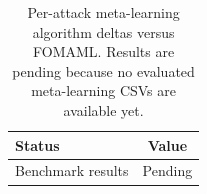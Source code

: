 \begin{table}[t]
\centering
\small
\begin{tabular}{lc}
\toprule
Status & Value \\
\midrule
Benchmark results & Pending \\
\bottomrule
\end{tabular}
\caption{Per-attack meta-learning algorithm deltas versus FOMAML. Results are pending because no evaluated meta-learning CSVs are available yet.}
\label{tab:stage2_meta_algorithm_delta}
\end{table}
